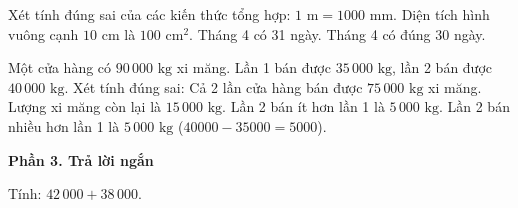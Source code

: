 \begin{ex} %
Xét tính đúng sai của các kiến thức tổng hợp:
\choiceTF
{\True $1\text{ m} = 1000\text{ mm}$.}
{\True Diện tích hình vuông cạnh $10\text{ cm}$ là $100\text{ cm}^2$.}
{Tháng 4 có 31 ngày.}
{\True Tháng 4 có đúng 30 ngày.}
\end{ex}

\begin{ex} %
Một cửa hàng có $90\,000\text{ kg}$ xi măng. Lần 1 bán được $35\,000\text{ kg}$, lần 2 bán được $40\,000\text{ kg}$. Xét tính đúng sai:
\choiceTF
{\True Cả 2 lần cửa hàng bán được $75\,000\text{ kg}$ xi măng.}
{\True Lượng xi măng còn lại là $15\,000\text{ kg}$.}
{Lần 2 bán ít hơn lần 1 là $5\,000\text{ kg}$.}
{\True Lần 2 bán nhiều hơn lần 1 là $5\,000\text{ kg}$ ($40000 - 35000 = 5000$).}
\end{ex}

\textbf{Phần 3. Trả lời ngắn}

\begin{ex} %
Tính: $42\,000 + 38\,000$.
\end{ex}


